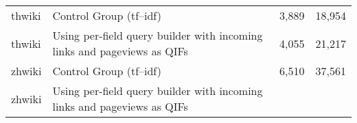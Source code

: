 \documentclass[12pt,]{article}
\begin{document}
\begin{longtable}[]{@{}llrr@{}}
\begin{minipage}[t]{0.08\columnwidth}\raggedright\strut
thwiki\strut
\end{minipage} & \begin{minipage}[t]{0.55\columnwidth}\raggedright\strut
Control Group (tf--idf)\strut
\end{minipage} & \begin{minipage}[t]{0.13\columnwidth}\raggedleft\strut
3,889\strut
\end{minipage} & \begin{minipage}[t]{0.13\columnwidth}\raggedleft\strut
18,954\strut
\end{minipage}\tabularnewline
\begin{minipage}[t]{0.08\columnwidth}\raggedright\strut
thwiki\strut
\end{minipage} & \begin{minipage}[t]{0.55\columnwidth}\raggedright\strut
Using per-field query builder with incoming links and pageviews as
QIFs\strut
\end{minipage} & \begin{minipage}[t]{0.13\columnwidth}\raggedleft\strut
4,055\strut
\end{minipage} & \begin{minipage}[t]{0.13\columnwidth}\raggedleft\strut
21,217\strut
\end{minipage}\tabularnewline
\begin{minipage}[t]{0.08\columnwidth}\raggedright\strut
zhwiki\strut
\end{minipage} & \begin{minipage}[t]{0.55\columnwidth}\raggedright\strut
Control Group (tf--idf)\strut
\end{minipage} & \begin{minipage}[t]{0.13\columnwidth}\raggedleft\strut
6,510\strut
\end{minipage} & \begin{minipage}[t]{0.13\columnwidth}\raggedleft\strut
37,561\strut
\end{minipage}\tabularnewline
\begin{minipage}[t]{0.08\columnwidth}\raggedright\strut
zhwiki\strut
\end{minipage} & \begin{minipage}[t]{0.55\columnwidth}\raggedright\strut
Using per-field query builder with incoming links and pageviews as
QIFs\strut
\end{minipage} & \begin{minipage}[t]{0.13\columnwidth}\raggedleft\strut

\end{minipage}
\end{longtable}
\end{document}
